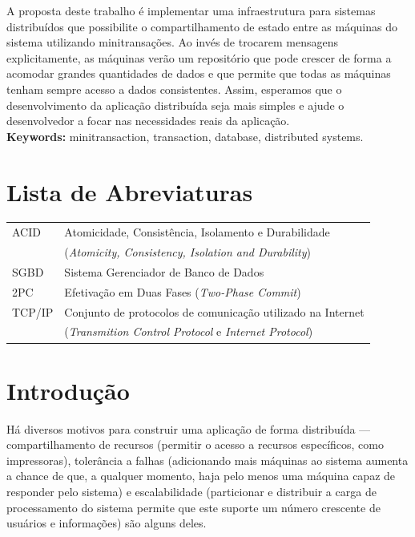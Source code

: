 \documentclass[11pt,twoside,a4paper]{book}
\begin{document}
A proposta deste trabalho é implementar uma infraestrutura para sistemas distribuídos que possibilite o compartilhamento de estado entre as máquinas do sistema utilizando minitransações. Ao invés de trocarem mensagens explicitamente, as máquinas verão um repositório que pode crescer de forma a acomodar grandes quantidades de dados e que permite que todas as máquinas tenham sempre acesso a dados consistentes. Assim, esperamos que o desenvolvimento da aplicação distribuída seja mais simples e ajude o desenvolvedor a focar nas necessidades reais da aplicação.
\\

\noindent \textbf{Keywords:} minitransaction, transaction, database, distributed systems.

\tableofcontents

\chapter{Lista de Abreviaturas}
\begin{tabular}{ll}
	ACID		& Atomicidade, Consistência, Isolamento e Durabilidade \\
			& (\emph{Atomicity, Consistency, Isolation and Durability})\\
        SGBD	& Sistema Gerenciador de Banco de Dados\\
	2PC		& Efetivação em Duas Fases (\emph{Two-Phase Commit})\\
	TCP/IP	& Conjunto de protocolos de comunicação utilizado na Internet\\
			& (\emph{Transmition Control Protocol} e \emph{Internet Protocol})\\
\end{tabular}

\listoffigures
\listoftables
\listofalgorithms

\mainmatter

\fancyhead[RE,LO]{\thesection}

\singlespacing              %

\chapter{Introdução}
\label{chap:introducao}
Há diversos motivos para construir uma aplicação de forma distribuída --- compartilhamento de recursos (permitir o acesso a recursos específicos, como impressoras), tolerância a falhas (adicionando mais máquinas ao sistema aumenta a chance de que, a qualquer momento, haja pelo menos uma máquina capaz de responder pelo sistema) e escalabilidade (particionar e distribuir a carga de processamento do sistema permite que este suporte um número crescente de usuários e informações) são alguns deles.
\end{document}
